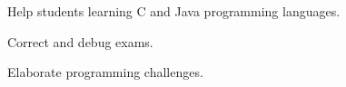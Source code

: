 \documentclass[]{willianpaixao-resume}
\begin{document}
\begin{minipage}[t]{0.64\textwidth}
\begin{tightemize}
    \item Help students learning C and Java programming languages.
    \item Correct and debug exams.
    \item Elaborate programming challenges.
\end{tightemize}
\sectionsep
\end{minipage} 
\end{document}
